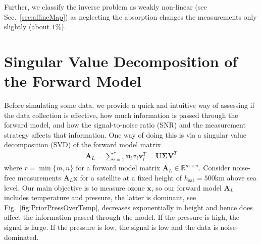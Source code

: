 Further, we classify the inverse problem as weakly non-linear (see Sec.~\ref{sec:affineMap}) as neglecting the absorption changes the measurements only slightly (about $1\%$).

\section{Singular Value Decomposition of the Forward Model}
\label{sec:SVD}
Before simulating some data, we provide a quick and intuitive way of assessing if the data collection is effective, how much information is passed through the forward model, and how the signal-to-noise ratio (SNR) and the measurement strategy affects that information.
One way of doing this is via a singular value decomposition (SVD) of the forward model matrix
\begin{align}
	\bm{A}_L = \sum_{i =1}^{r} \bm{u}_i  \sigma_i \bm{v}^T_i = \bm{U} \bm{\Sigma} \bm{V}^T
\end{align}
where $r = \min\{m,n\}$ for a forward model matrix $\bm{A}_L \in \mathbb{R}^{m \times n}$.
Consider noise-free measurements $\bm{A}_L\bm{x}$ for a satellite at a fixed height of $h_{\text{sat}} = 500$km above sea level.
Our main objective is to measure ozone $\bm{x}$, so our forward model $\bm{A}_L$ includes temperature and pressure, the latter is dominant, see Fig.~\ref{fig:PriorPressOverTemp}, decreases exponentially in height and hence does affect the information passed through the model.
If the pressure is high, the signal is large.
If the pressure is low, the signal is low and the data is noise-dominated.

